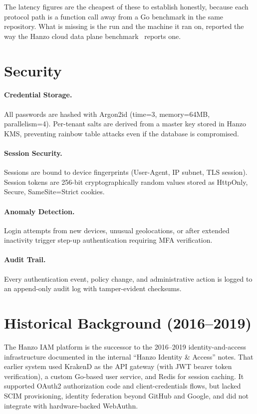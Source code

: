 \documentclass[11pt,twocolumn]{article}
\begin{document}
The latency figures are the cheapest of these to establish honestly, because
each protocol path is a function call away from a Go benchmark in the same
repository. What is missing is the run and the machine it ran on, reported the
way the Hanzo cloud data plane benchmark~\cite{clouddataplane} reports one.

\section{Security}
\label{sec:security}

\paragraph{Credential Storage.} All passwords are hashed with Argon2id (time=3, memory=64MB, parallelism=4). Per-tenant salts are derived from a master key stored in Hanzo KMS, preventing rainbow table attacks even if the database is compromised.

\paragraph{Session Security.} Sessions are bound to device fingerprints (User-Agent, IP subnet, TLS session). Session tokens are 256-bit cryptographically random values stored as HttpOnly, Secure, SameSite=Strict cookies.

\paragraph{Anomaly Detection.} Login attempts from new devices, unusual geolocations, or after extended inactivity trigger step-up authentication requiring MFA verification.

\paragraph{Audit Trail.} Every authentication event, policy change, and administrative action is logged to an append-only audit log with tamper-evident checksums.

\section{Historical Background (2016--2019)}

The Hanzo IAM platform is the successor to the 2016--2019 identity-and-access infrastructure documented in the internal ``Hanzo Identity \& Access'' notes. That earlier system used KrakenD as the API gateway (with JWT bearer token verification), a custom Go-based user service, and Redis for session caching. It supported OAuth2 authorization code and client-credentials flows, but lacked SCIM provisioning, identity federation beyond GitHub and Google, and did not integrate with hardware-backed WebAuthn.
\end{document}
